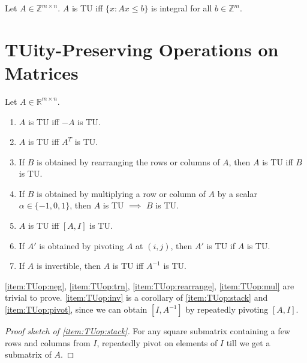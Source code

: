 \documentclass[a4paper,12pt,fleqn]{article}
\newenvironment*{tightenum}{\begin{enumerate}[noitemsep]}{\end{enumerate}}
\begin{document}
\begin{theorem}
Let $A \in \mathbb{Z}^{m \times n}$. $A$ is TU iff
$\{x: Ax \le b\}$ is integral for all $b \in \mathbb{Z}^m$.
\end{theorem}

\section{TUity-Preserving Operations on Matrices}

\begin{lemma}
Let $A \in \mathbb{R}^{m \times n}$.
\begin{tightenum}
\item\label{item:TUop:neg}$A$ is TU iff $-A$ is TU.
\item\label{item:TUop:trn}$A$ is TU iff $A^T$ is TU.
\item\label{item:TUop:rearrange}If $B$ is obtained by rearranging the rows or columns of $A$,
    then $A$ is TU iff $B$ is TU.
\item\label{item:TUop:mul}If $B$ is obtained by multiplying a row or column of $A$ by a scalar $\alpha \in \{-1, 0, 1\}$,
    then $A$ is TU $\implies$ $B$ is TU.
\item\label{item:TUop:stack}$A$ is TU iff $[A, I]$ is TU.
\item\label{item:TUop:pivot}If $A'$ is obtained by pivoting $A$ at $(i, j)$, then $A'$ is TU if $A$ is TU.
\item\label{item:TUop:inv}If $A$ is invertible, then $A$ is TU iff $A^{-1}$ is TU.
\end{tightenum}
\end{lemma}
\ref{item:TUop:neg}, \ref{item:TUop:trn}, \ref{item:TUop:rearrange}, \ref{item:TUop:mul} are trivial to prove.
\ref{item:TUop:inv} is a corollary of \ref{item:TUop:stack} and \ref{item:TUop:pivot},
since we can obtain $[I, A^{-1}]$ by repeatedly pivoting $[A, I]$.
\begin{proof}[Proof sketch of \ref{item:TUop:stack}]
For any square submatrix containing a few rows and columns from $I$,
repeatedly pivot on elements of $I$ till we get a submatrix of $A$.
\end{proof}
\end{document}
